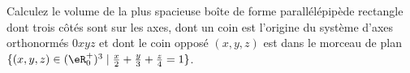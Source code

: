 
\begin{exercice}\label{exoOptimSS0005}

Calculez le volume de la plus spacieuse boîte  de forme parallélépipède rectangle dont trois côtés sont sur les axes, dont un coin est l'origine du système d'axes orthonormés $0xyz$ et dont le coin opposé $(x,y,z)$ est dans le morceau de plan $\{ (x,y,z) \in (\eR^+_0)^3 \mid \frac{x}2 + \frac{y}3 + \frac{z}4 = 1 \}$.


\end{exercice}
